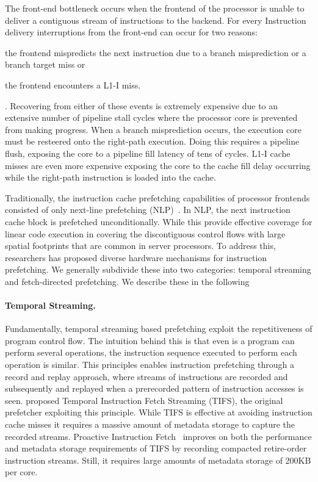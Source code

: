 \documentclass[../main.tex]{subfiles}
\begin{document}
\begin{refsection}
The front-end bottleneck occurs when the frontend of the processor is
unable to deliver a contiguous stream of instructions to the
backend.
For every Instruction delivery interruptions from the front-end can
occur for two reasons: \begin{inparaenum}[1)] \item the frontend
  mispredicts the next instruction due to a branch misprediction or a
  branch target miss or \item the frontend encounters a L1-I
  miss.\end{inparaenum}. Recovering from either of these events is
extremely expensive due to an extensive number of pipeline stall
cycles where the processor core is prevented from making
progress. When a branch misprediction occurs, the execution core must
be resteered onto the right-path execution. Doing this requires a
pipeline flush, exposing the core to a pipeline fill latency of tens
of cycles. L1-I cache misses are even more expensive exposing the core
to the cache fill delay occurring while the right-path instruction is
loaded into the cache.

Traditionally, the instruction cache prefetching capabilities of
processor frontends consisted of only next-line prefetching
(NLP)~\cite{nextline_pref}. In NLP, the next instruction cache block
is prefetched unconditionally. While this provide effective coverage
for linear code execution in covering the discontiguous control flows
with large spatial footprints that are common in server processors. To
address this, researchers has proposed diverse hardware mechanisms for
instruction prefetching. We generally subdivide these into two
categories: temporal streaming and fetch-directed prefetching. We describe these in the following

\paragraph{Temporal Streaming.} Fundamentally, temporal streaming
based prefetching exploit the repetitiveness of program control
flow. The intuition behind this is that even is a program can perform
several operations, the instruction sequence executed to perform each
operation is similar. This principles enables instruction prefetching
through a record and replay approach, where streams of instructions
are recorded and subsequently and replayed when a prerecorded pattern
of instruction accesses is seen. \textcite{ferdman08_tempor} proposed
Temporal Instruction Fetch Streaming (TIFS), the original prefetcher
exploiting this principle. While TIFS is effective at avoiding
instruction cache misses it requires a massive amount of metadata
storage to capture the recorded streams.  Proactive Instruction
Fetch~\cite{ferdman11_proac_instr_fetch} improves on both the performance and metadata storage requirements of TIFS by recording compacted retire-order instruction streams. Still, it requires large amounts of metadata storage of 200KB per core.


\end{refsection}
\end{document}
